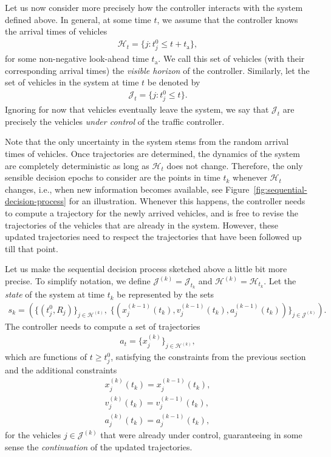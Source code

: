 \documentclass{article}
\theoremstyle{definition}
\theoremstyle{plain}
\begin{document}
Let us now consider more precisely how the controller interacts with the system
defined above.
In general, at some time $t$, we assume that the controller knows the arrival
times of vehicles
\begin{align}
  \mathcal{H}_{t} = \{ j : t_{j}^{0} \leq t + t_{\text{a}}\} ,
\end{align}
for some non-negative look-ahead time $t_{\text{a}}$. We call this set of
vehicles (with their corresponding arrival times) the \textit{visible horizon}
of the controller. Similarly, let the set of vehicles in the system at time $t$
be denoted by
\begin{align}
  \mathcal{J}_{t} = \{ j : t_{j}^{0} \leq t \} .
\end{align}
Ignoring for now that vehicles eventually leave the system, we say that
$\mathcal{J}_{t}$ are precisely the vehicles \textit{under control} of the
traffic controller.

Note that the only uncertainty in the system stems from the random arrival times
of vehicles. Once trajectories are determined, the dynamics of the system are
completely deterministic as long as $\mathcal{H}_{t}$ does not change.
Therefore, the only sensible decision epochs to consider are the points in time
$t_{k}$ whenever $\mathcal{H}_{t}$ changes, i.e., when new information becomes
available, see Figure~\ref{fig:sequential-decision-process} for an illustration.
Whenever this happens, the controller needs to compute a trajectory for the
newly arrived vehicles, and is free to revise the trajectories of the vehicles
that are already in the system. However, these updated trajectories need to
respect the trajectories that have been followed up till that point.

Let us make the sequential decision process sketched above a little bit more
precise. To simplify notation, we define
$\mathcal{J}^{(k)} = \mathcal{J}_{t_{k}}$ and
$\mathcal{H}^{(k)} = \mathcal{H}_{t_{k}}$. Let the \textit{state} of the system
at time $t_{k}$ be represented by the sets
\begin{align}
  s_{k} = (\{(t_{j}^{0}, R_{j})\}_{j \in \mathcal{H}^{(k)}}, \;
  \{(x_{j}^{(k-1)}(t_{k}), v_{j}^{(k-1)}(t_{k}), a_{j}^{(k-1)}(t_{k}))\}_{j \in \mathcal{J}^{(k)}} ) .
\end{align}
The controller needs to compute a set of trajectories
\begin{align}
a_{t} = \{ x_{j}^{(k)}\}_{j \in \mathcal{H}^{(k)}} ,
\end{align}
which are functions of $t \geq t_{j}^{0}$, satisfying the constraints from the
previous section and the additional constraints
\begin{subequations}
\begin{align}
  x_{j}^{(k)}(t_{k}) = x_{j}^{(k-1)}(t_{k}), \\
  v_{j}^{(k)}(t_{k}) = v_{j}^{(k-1)}(t_{k}), \\
  a_{j}^{(k)}(t_{k}) = a_{j}^{(k-1)}(t_{k}),
\end{align}
\end{subequations}
for the vehicles $j \in \mathcal{J}^{(k)}$ that were already under control,
guaranteeing in some sense the \textit{continuation} of the updated
trajectories.
\end{document}

